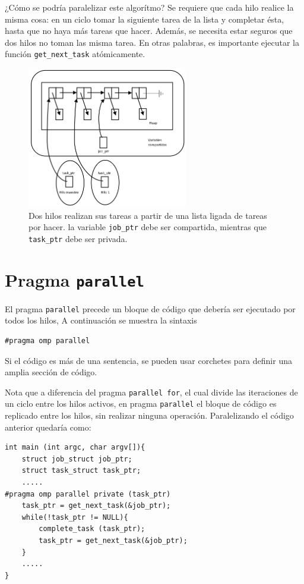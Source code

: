 \documentclass[12pt,letterpaper]{book}
\begin{document}
¿Cómo se podría paralelizar este algorítmo? Se requiere que cada hilo realice la misma cosa: en un ciclo tomar la siguiente tarea de la lista y completar ésta, hasta que no haya más tareas que hacer. Además, se necesita estar seguros que dos hilos no toman las misma tarea. En otras palabras, es importante ejecutar la función \texttt{get\_next\_task} atómicamente.

\begin{figure}
\begin{center}
\includegraphics[width=7cm]{../imagenes/task_algorithm.png} 
\end{center}
\caption{Dos hilos realizan sus tareas a partir de una lista ligada de tareas por hacer. la variable \texttt{job\_ptr} debe ser compartida, mientras que \texttt{task\_ptr} debe ser privada.}
\label{fig:task_algorithm}
\end{figure}


\section{Pragma \texttt{parallel}}
El pragma \texttt{parallel} precede un bloque de código que debería ser ejecutado por todos los hilos, A continuación se muestra la sintaxis

\begin{lstlisting}[style=C]
#pragma omp parallel
\end{lstlisting}

Si el código es más de una sentencia, se pueden usar corchetes para definir una amplia sección de código.

Nota que a diferencia del pragma \texttt{parallel for}, el cual divide las iteraciones de un ciclo entre los hilos activos, en pragma \texttt{parallel} el bloque de código es replicado entre los hilos, sin realizar ninguna operación. Paralelizando el código anterior quedaría como:

\begin{lstlisting}[style=C]
int main (int argc, char argv[]){
	struct job_struct job_ptr;
	struct task_struct task_ptr;
	.....
#pragma omp parallel private (task_ptr)	
	task_ptr = get_next_task(&job_ptr);
	while(!task_ptr != NULL){
		complete_task (task_ptr);
		task_ptr = get_next_task(&job_ptr);
	}
	.....
}
\end{lstlisting}
\end{document}
